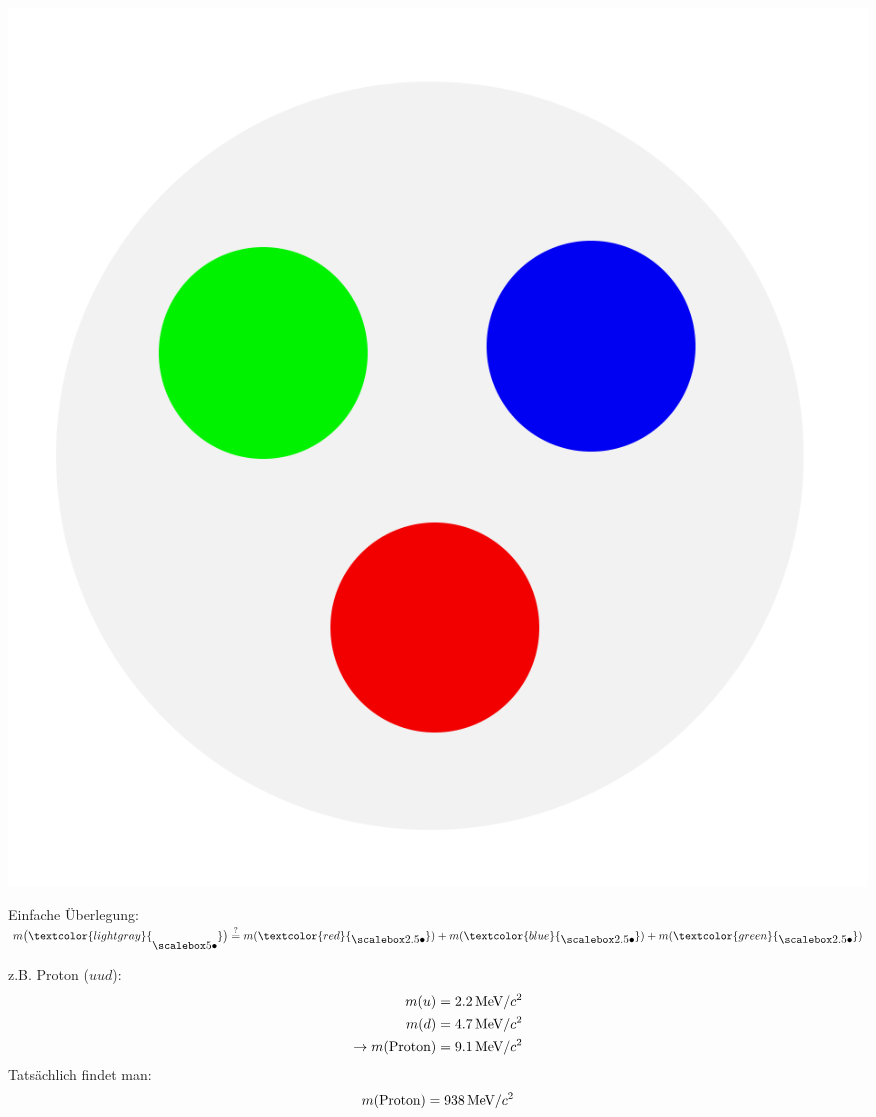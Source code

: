\subsection{}
\begin{frame}
\begin{minipage} {0.3\textwidth}
\includegraphics[width=\textwidth]{Figures Introductory Lecture/Standard Model/Hadron_coloured.png}
\end{minipage}
\begin{minipage} {0.65\textwidth}
Einfache Überlegung:\\  $m\big( \textcolor{lightgray}{ \BigbulletG}\big)\overset{?}{=}m(\textcolor{red}{\Bigbullet})+m(\textcolor{blue}{\Bigbullet})+m(\textcolor{green}{\Bigbullet})$
\end{minipage}
z.B. Proton ($uud$):\\
\begin{align*} 
m(u)&=2.2  \,\textmd{MeV}/c^2\\m(d)&= 4.7 \, \textmd{MeV}/c^2 \\ \rightarrow m(\textmd{Proton})&=9.1  \,\textmd{MeV}/c^2
\end{align*} 
Tatsächlich findet man:
\begin{align*} 
m(\textmd{Proton})=938  \,\textmd{MeV}/c^2
\end{align*} 
\end{frame}
